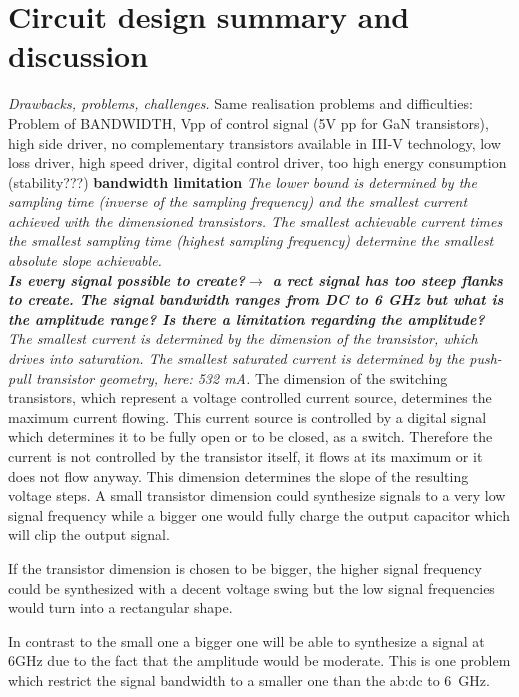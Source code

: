 \section{Circuit design summary and discussion}
\textit{Drawbacks, problems, challenges.}
Same realisation problems and difficulties: Problem of BANDWIDTH, Vpp of control signal (5V pp for GaN transistors), high side driver, no complementary transistors available in III-V technology, low loss driver, high speed driver, digital control driver, too high energy consumption (stability???)
\textbf{bandwidth limitation}
\textit{The lower bound is determined by the sampling time (inverse of the sampling frequency) and the smallest current achieved with the dimensioned transistors.
 The smallest achievable current times the smallest sampling time (highest sampling frequency) determine the smallest absolute slope achievable. \\
 \textbf{Is every signal possible to create?$\rightarrow$ a rect signal has too steep flanks to create. The signal bandwidth ranges from DC to 6 GHz but what is the amplitude range? Is there a limitation regarding the amplitude?}
\\
The smallest current is determined by the dimension of the transistor, which drives into saturation. 
The smallest saturated current is determined by the push-pull transistor geometry, here: 532 mA.}
The dimension of the switching transistors, which represent a voltage controlled current source, determines the maximum current flowing.
This current source is controlled by a digital signal which determines it to be fully open or to be closed, as a switch.
Therefore the current is not controlled by the transistor itself, it flows at its maximum or it does not flow anyway.
This dimension determines the slope of the resulting voltage steps.
A small transistor dimension could synthesize signals to a very low signal frequency while a bigger one would fully charge the output capacitor which will clip the output signal.

If the transistor dimension is chosen to be bigger, the higher signal frequency could be synthesized with a decent voltage swing but the low signal frequencies would turn into a rectangular shape. 

In contrast to the small one a bigger one will be able to synthesize a signal at 6GHz due to the fact that the amplitude would be moderate.
This is one problem which restrict the signal bandwidth to a smaller one than the \gls{ab:dc} to \SI{6}{\GHz}.